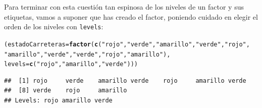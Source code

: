 \documentclass[10pt,a4paper]{article}\usepackage[]{graphicx}\usepackage[]{color}
\makeatletter
\newcommand{\hlstr}[1]{\textcolor[rgb]{0.192,0.494,0.8}{#1}}%
\newcommand{\hlstd}[1]{\textcolor[rgb]{0.345,0.345,0.345}{#1}}%
\newcommand{\hlkwb}[1]{\textcolor[rgb]{0.69,0.353,0.396}{#1}}%
\newcommand{\hlkwc}[1]{\textcolor[rgb]{0.333,0.667,0.333}{#1}}%
\newcommand{\hlkwd}[1]{\textcolor[rgb]{0.737,0.353,0.396}{\textbf{#1}}}%
\newenvironment{kframe}{%
 \def\at@end@of@kframe{}%
 \ifinner\ifhmode%
  \def\at@end@of@kframe{\end{minipage}}%
  \begin{minipage}{\columnwidth}%
 \fi\fi%
 \def\FrameCommand##1{\hskip\@totalleftmargin \hskip-\fboxsep
 \colorbox{shadecolor}{##1}\hskip-\fboxsep
     \hskip-\linewidth \hskip-\@totalleftmargin \hskip\columnwidth}%
 \MakeFramed {\advance\hsize-\width
   \@totalleftmargin\z@ \linewidth\hsize
   \@setminipage}}%
 {\par\unskip\endMakeFramed%
 \at@end@of@kframe}
\newenvironment{knitrout}{}{} %
\makeatother
\begin{document}
Para terminar con esta cuestión tan espinosa de los niveles de un factor y sus etiquetas, vamos a suponer que has creado el factor, poniendo cuidado en elegir el orden de los niveles con {\tt levels}:

\begin{knitrout}
\color{fgcolor}\begin{kframe}
\begin{alltt}
\hlstd{(estadoCarreteras} \hlkwb{=} \hlkwd{factor}\hlstd{(}\hlkwd{c}\hlstd{(}\hlstr{"rojo"}\hlstd{,} \hlstr{"verde"}\hlstd{,} \hlstr{"amarillo"}\hlstd{,} \hlstr{"verde"}\hlstd{,} \hlstr{"rojo"}\hlstd{,}
    \hlstr{"amarillo"}\hlstd{,} \hlstr{"verde"}\hlstd{,} \hlstr{"verde"}\hlstd{,} \hlstr{"rojo"}\hlstd{,} \hlstr{"amarillo"}\hlstd{),}
    \hlkwc{levels} \hlstd{=} \hlkwd{c}\hlstd{(}\hlstr{"rojo"}\hlstd{,} \hlstr{"amarillo"}\hlstd{,} \hlstr{"verde"}\hlstd{)))}
\end{alltt}
\begin{verbatim}
##  [1] rojo     verde    amarillo verde    rojo     amarillo verde   
##  [8] verde    rojo     amarillo
## Levels: rojo amarillo verde
\end{verbatim}
\end{kframe}
\end{knitrout}
\end{document}
